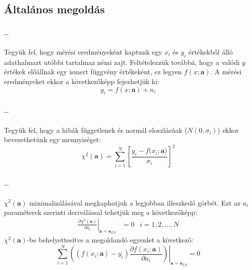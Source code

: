 \documentclass [aspectratio=169]{beamer}
\newcommand{\titten}{\secname{} -- \subsecname}
\begin{document}
\subsection{Általános megoldás}
\begin{frame}
\frametitle{\titten}
Tegyük fel, hogy mérési eredményeként kaptunk egy $x_i$ és $y_i$ értékekből álló adathalmazt utóbbi tartalmaz némi zajt. Feltételezzük továbbá, hogy a valódi $y$ értékek előállnak egy ismert függvény értékeként, ez legyen $f(x;\mathbf{a})$. A mérési eredményeket ekkor a következőképp fejezhetjük ki:
\begin{equation*}
y_i=f(x;\mathbf{a})+n_i
\end{equation*}
\end{frame}
\begin{frame}
\frametitle{\titten}
Tegyük fel, hogy a hibák függetlenek és normál eloszlásúak ($N(0,\sigma_i)$) ekkor bevezethetünk egy mennyiséget:
\begin{equation*}
\chi^2(\mathbf{a})=\sum_{i=1}^N\left[\frac{y_i-f(x_i;\mathbf{a)}}{\sigma_i}\right]^2
\end{equation*}
\end{frame}
\begin{frame}
\frametitle{\titten}
$\chi^2(\mathbf{a})$ minimalizálásával megkaphatjuk a legjobban illeszkedő görbét. Ezt az $a_i$ paraméterek szerinti deriválással tehetjük meg a következőképp:
\begin{align*}
\left.\frac{\partial\chi^2(\mathbf{a})}{\partial a_i}\right\vert_{\mathbf{a}=\mathbf{a}_{LS}}&=0 & i=1,2,\dots,N
\end{align*}
$\chi^2(\mathbf{a})$-be behelyettesítve a megoldandó egyenlet a következő:
\begin{equation*}
\sum	_{i=1}^N\left.\left((f(x_i;\mathbf{a})-y_i)\frac{\partial f(x_i;\mathbf{a})}{\partial a_i}\right)\right\vert_{\mathbf{a}=\mathbf{a}_{LS}}=0
\end{equation*}
\end{frame}
\end{document}
